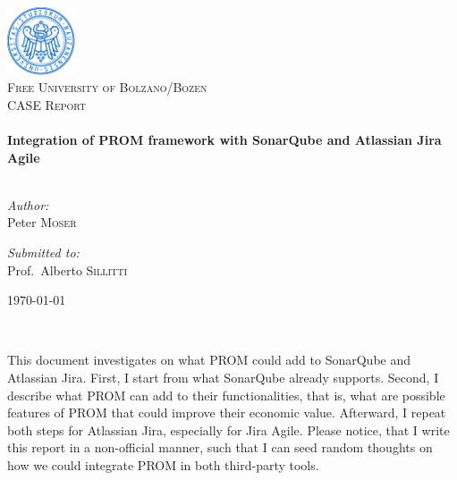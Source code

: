 
\begin{titlepage}
\begin{center}

\includegraphics[width=0.15\textwidth]{img/logo.pdf}
~\\[1cm]
\textsc{\LARGE Free University of Bolzano/Bozen}
\\[1.5cm]
\textsc{\Large CASE Report}
\\[0.5cm]

\HRule{0.5pt} 
\\[0.4cm]
{ 
	\huge 
	\bfseries 
	Integration of PROM framework with SonarQube and Atlassian Jira Agile \\[0.4cm] 
}
\HRule{2pt} 
\\[1.5cm]

\noindent
\begin{minipage}{0.4\textwidth}
	\begin{flushleft} \large
		\emph{Author:}\\
		Peter \textsc{Moser}
	\end{flushleft}
\end{minipage}%
\begin{minipage}{0.4\textwidth}
	\begin{flushright} \large
		\emph{Submitted to:} \\
		Prof.~Alberto \textsc{Sillitti}
	\end{flushright}
\end{minipage}


\vspace{2cm}

{\large \today}

\vfill

\HRule{0.1pt} 
\\[0.2cm]
\begin{flushleft}
This document investigates on what PROM could add to SonarQube and Atlassian
Jira. First, I start from what SonarQube already supports. Second, I describe
what PROM can add to their functionalities, that is, what are possible features
of PROM that could improve their economic value. Afterward, I repeat both steps
for Atlassian Jira, especially for Jira Agile. Please notice, that I write this
report in a non-official manner, such that I can seed random thoughts on how we
could integrate PROM in both third-party tools.
\end{flushleft}
\HRule{0.1pt}
\end{center}
\end{titlepage}